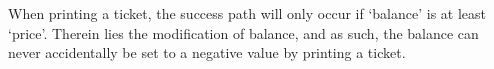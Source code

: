 When printing a ticket, the success path will only occur if `balance' is
at least `price'. Therein lies the modification of balance, and as such,
the balance can never accidentally be set to a negative value by
printing a ticket.
